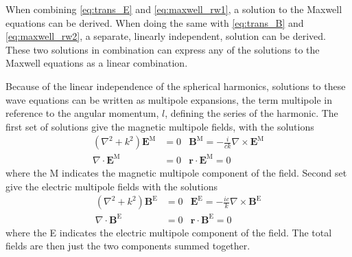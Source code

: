 When combining \ref{eq:trans_E} and \ref{eq:maxwell_rw1}, a solution to the Maxwell equations can be derived. When doing the same with \ref{eq:trans_B} and \ref{eq:maxwell_rw2}, a separate, linearly independent, solution can be derived. These two solutions in combination can express any of the solutions to the Maxwell equations as a linear combination.

Because of the linear independence of the spherical harmonics, solutions to these wave equations can be written as multipole expansions, the term multipole in reference to the angular momentum, $l$, defining the series of the harmonic. The first set of solutions give the magnetic multipole fields, with the solutions
\begin{subequations}
\label{eq:magnetic_sol}
\begin{align}
    \left(\nabla^2+k^2\right)\textbf{E}^\text{M} & = 0 & \textbf{B}^\text{M}=-\frac{i}{ck} \nabla \times \textbf{E}^\text{M} \\
    \nabla \cdot \textbf{E}^\text{M} & = 0 & \textbf{r}\cdot\textbf{E}^\text{M}=0
\end{align}
\end{subequations}
where the M indicates the magnetic multipole component of the field. Second set give the electric multipole fields with the solutions
\begin{subequations}
\label{eq:electric_sol}
\begin{align}
    \left(\nabla^2+k^2\right)\textbf{B}^\text{E} & = 0 & \textbf{E}^\text{E}=-\frac{ic}{k} \nabla \times \textbf{B}^\text{E} \\
    \nabla \cdot \textbf{B}^\text{E} & = 0 & \textbf{r}\cdot\textbf{B}^\text{E}=0
\end{align}
\end{subequations}
where the E indicates the electric multipole component of the field. The total fields are then just the two components summed together.

